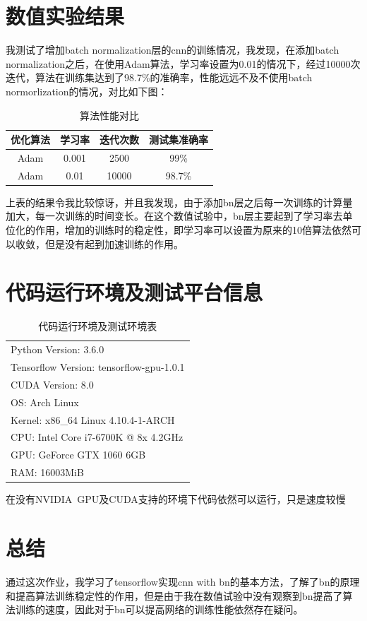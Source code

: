 \documentclass[a4paper, UTF8]{ctexrep}
\begin{document}
        \section{数值实验结果} %
        \label{sec:数值实验结果}
          我测试了增加batch normalization层的cnn的训练情况，我发现，在添加batch normalization之后，在使用Adam算法，学习率设置为0.01的情况下，经过10000次迭代，算法在训练集达到了98.7\%的准确率，性能远远不及不使用batch normorlization的情况，对比如下图：
            \begin{table}[htbp!]
                \centering
                \begin{tabular}{cccc}
                    \hline
                    优化算法 & 学习率 & 迭代次数 & 测试集准确率 \\
                    \hline
                    Adam & 0.001 & 2500 & 99\% \\
                    Adam & 0.01 & 10000 & 98.7\% \\
                    \hline
                \end{tabular}
                \caption{算法性能对比}
            \end{table}
            上表的结果令我比较惊讶，并且我发现，由于添加bn层之后每一次训练的计算量加大，每一次训练的时间变长。在这个数值试验中，bn层主要起到了学习率去单位化的作用，增加的训练时的稳定性，即学习率可以设置为原来的10倍算法依然可以收敛，但是没有起到加速训练的作用。

    \section{代码运行环境及测试平台信息}
      \begin{table}[htbp!]
        \centering
        \begin{tabular}{l}
          \hline
          Python Version: 3.6.0 \\
          Tensorflow Version: tensorflow-gpu-1.0.1 \\
          CUDA Version: 8.0 \\
          OS: Arch Linux \\
          Kernel: x86\_64 Linux 4.10.4-1-ARCH \\
          CPU: Intel Core i7-6700K @ 8x 4.2GHz \\
          GPU: GeForce GTX 1060 6GB \\
          RAM: 16003MiB \\
          \hline
        \end{tabular}
        \caption{代码运行环境及测试环境表}
      \end{table}
      在没有NVIDIA\ GPU及CUDA支持的环境下代码依然可以运行，只是速度较慢
    \section{总结}
      通过这次作业，我学习了tensorflow实现cnn with bn的基本方法，了解了bn的原理和提高算法训练稳定性的作用，但是由于我在数值试验中没有观察到bn提高了算法训练的速度，因此对于bn可以提高网络的训练性能依然存在疑问。
\end{document}
